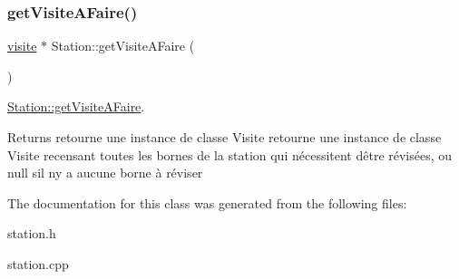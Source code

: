 \subsubsection{\texorpdfstring{get\+Visite\+A\+Faire()}{getVisiteAFaire()}}
{\footnotesize\ttfamily \hyperlink{classvisite}{visite} $\ast$ Station\+::get\+Visite\+A\+Faire (\begin{DoxyParamCaption}{ }\end{DoxyParamCaption})}



\hyperlink{class_station_a0f0c47ed8e52e6d506c50512b915049a}{Station\+::get\+Visite\+A\+Faire}. 

\begin{DoxyReturn}{Returns}
retourne une instance de classe Visite retourne une instance de classe Visite recensant toutes les bornes de la station qui nécessitent d\textquotesingle{}être révisées, ou null s\textquotesingle{}il n\textquotesingle{}y a aucune borne à réviser 
\end{DoxyReturn}


The documentation for this class was generated from the following files\+:\begin{DoxyCompactItemize}
\item 
station.\+h\item 
station.\+cpp\end{DoxyCompactItemize}
